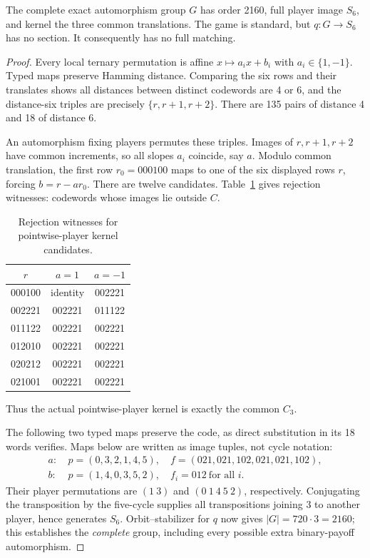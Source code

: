 \begin{theorem}\label{thm:six}
The complete exact automorphism group $G$ has order 2160, full player image
$S_6$, and kernel the three common translations. The game is standard, but
$q:G\to S_6$ has no section. It consequently has no full matching.
\end{theorem}
\begin{proof}
Every local ternary permutation is affine $x\mapsto a_i x+b_i$ with
$a_i\in\{1,-1\}$. Typed maps preserve Hamming distance. Comparing the six
rows and their translates shows all distances between distinct codewords
are 4 or 6, and the distance-six triples are precisely
$\{r,r+1,r+2\}$. There are 135 pairs of distance 4 and 18 of distance 6.

An automorphism fixing players permutes these triples. Images of $r,r+1,r+2$
have common increments, so all slopes $a_i$ coincide, say $a$. Modulo common
translation, the first row $r_0=000100$ maps to one of the six displayed rows $r$,
forcing $b=r-ar_0$. There are twelve candidates. Table~\ref{tab:kernel} gives rejection witnesses: codewords whose images lie outside $C$.
\begin{table}[htbp]
\centering
\caption{Rejection witnesses for pointwise-player kernel candidates.}\label{tab:kernel}
\begin{tabular}{ccc}
\toprule
$r$&$a=1$&$a=-1$\\\midrule
000100&identity&002221\\002221&002221&011122\\
011122&002221&002221\\012010&002221&002221\\
020212&002221&002221\\021001&002221&002221\\
\bottomrule
\end{tabular}
\end{table}
Thus the actual pointwise-player kernel is exactly the common $C_3$.

The following two typed maps preserve the code, as direct substitution in its
18 words verifies. Maps below are written as image tuples, not cycle notation:
\[
\begin{split}
a:&\ p=(0,3,2,1,4,5),\quad
 f=(021,021,102,021,021,102),\\
b:&\ p=(1,4,0,3,5,2),\quad f_i=012\ \text{for all }i.
\end{split}
\]
Their player permutations are $(1\ 3)$ and $(0\ 1\ 4\ 5\ 2)$, respectively.
Conjugating the transposition by the five-cycle supplies all transpositions
joining 3 to another player, hence generates $S_6$. Orbit--stabilizer for $q$
now gives $|G|=720\cdot3=2160$; this establishes the \emph{complete} group,
including every possible extra binary-payoff automorphism.


\end{proof}
